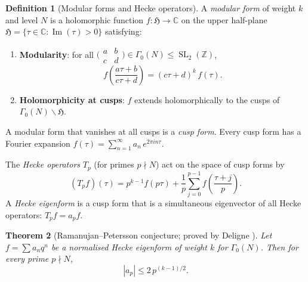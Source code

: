 \documentclass[11pt,a4paper]{article}
\theoremstyle{plain}
\newtheorem{theorem}{Theorem}[section]
\theoremstyle{definition}
\newtheorem{definition}[theorem]{Definition}
\newcommand{\Z}{\mathbb{Z}}
\newcommand{\C}{\mathbb{C}}
\newcommand{\SL}{\operatorname{SL}}
\begin{document}
\begin{tcolorbox}[breakable, colback=green!8, colframe=green!8,
  boxrule=0pt, sharp corners]
\begin{definition}[Modular forms and Hecke operators]
\label{def:modular}
A \emph{modular form} of weight $k$ and level $N$ is a holomorphic
function $f : \mathfrak{H} \to \C$ on the upper half-plane
$\mathfrak{H} = \{\tau \in \C : \operatorname{Im}(\tau) > 0\}$
satisfying:
\begin{enumerate}
\item \textbf{Modularity}: for all
$\bigl(\begin{smallmatrix} a & b \\ c & d \end{smallmatrix}\bigr)
\in \Gamma_0(N) \leq \SL_2(\Z)$,
\[
  f\!\left(\frac{a\tau + b}{c\tau + d}\right)
  = (c\tau + d)^k\, f(\tau).
\]
\item \textbf{Holomorphicity at cusps}: $f$ extends holomorphically
  to the cusps of $\Gamma_0(N) \backslash \mathfrak{H}$.
\end{enumerate}
A modular form that vanishes at all cusps is a \emph{cusp form}.
Every cusp form has a Fourier expansion
$f(\tau) = \sum_{n=1}^{\infty} a_n\, e^{2\pi i n \tau}$.

The \emph{Hecke operators} $T_p$ (for primes $p \nmid N$) act on
the space of cusp forms by
\[
  (T_p f)(\tau) = p^{k-1} f(p\tau)
  + \frac{1}{p} \sum_{j=0}^{p-1} f\!\left(\frac{\tau + j}{p}\right).
\]
A \emph{Hecke eigenform} is a cusp form that is a simultaneous
eigenvector of all Hecke operators: $T_p f = a_p f$.
\end{definition}
\end{tcolorbox}

\begin{tcolorbox}[breakable, colback=black!5, colframe=black!5,
  boxrule=0pt, sharp corners]
\begin{theorem}[Ramanujan--Petersson conjecture; proved by
Deligne \cite{Deligne1974}]
\label{thm:ramanujan-petersson}
Let $f = \sum a_n q^n$ be a normalised Hecke eigenform of weight $k$
for $\Gamma_0(N)$. Then for every prime $p \nmid N$,
\begin{equation}
\label{eq:rp-bound}
  |a_p| \leq 2\, p^{(k-1)/2}.
\end{equation}
\end{theorem}
\end{tcolorbox}
\end{document}
